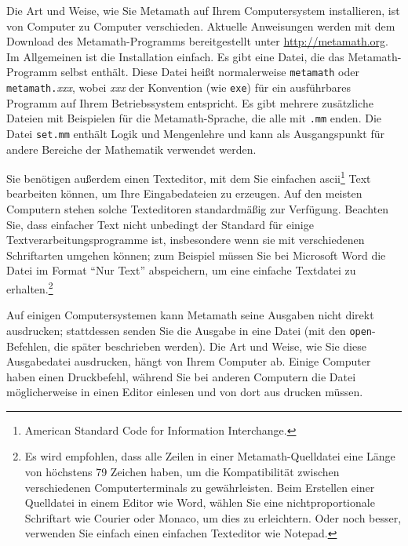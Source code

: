 Die Art und Weise, wie Sie Metamath auf Ihrem Computersystem installieren, ist von Computer zu Computer verschieden.  Aktuelle Anweisungen werden mit dem Download des Metamath-Programms bereitgestellt unter \url{http://metamath.org}.  Im Allgemeinen ist die Installation einfach.
Es gibt eine Datei, die das Metamath-Programm selbst enthält.  
Diese Datei heißt normalerweise \texttt{metamath} oder \texttt{metamath.}{\em xxx}, wobei {\em xxx} der Konvention (wie \texttt{exe}) für ein ausführbares Programm auf Ihrem Betriebssystem entspricht.  Es gibt mehrere zusätzliche Dateien mit Beispielen für die Metamath-Sprache, die alle mit \texttt{.mm} enden.  Die Datei \texttt{set.mm} enthält Logik und Mengenlehre und kann als Ausgangspunkt für andere Bereiche der Mathematik verwendet werden.

Sie benötigen außerdem einen Texteditor, mit dem Sie einfachen {\sc ascii}\footnote{American Standard Code for Information Interchange.} Text bearbeiten können, um Ihre Eingabedateien zu erzeugen.  Auf den meisten Computern stehen solche Texteditoren standardmäßig zur Verfügung.  Beachten Sie, dass einfacher Text nicht unbedingt der Standard für einige Textverarbeitungsprogramme ist, insbesondere wenn sie mit verschiedenen Schriftarten umgehen können; zum Beispiel müssen Sie bei Microsoft Word die Datei im Format "`Nur Text"' abspeichern, um eine einfache Textdatei zu erhalten.\footnote{Es wird empfohlen, dass alle Zeilen in einer Metamath-Quelldatei eine Länge von höchstens 79 Zeichen haben, um die Kompatibilität zwischen verschiedenen Computerterminals zu gewährleisten.  Beim Erstellen einer Quelldatei in einem Editor wie Word, wählen Sie eine nichtproportionale Schriftart wie Courier oder Monaco, um dies zu erleichtern.  Oder noch besser, verwenden Sie einfach einen einfachen Texteditor wie Notepad.}

Auf einigen Computersystemen kann Metamath seine Ausgaben nicht direkt ausdrucken; stattdessen senden Sie die Ausgabe in eine Datei (mit den \texttt{open}-Befehlen, die später beschrieben werden).  Die Art und Weise, wie Sie diese Ausgabedatei ausdrucken, hängt von Ihrem Computer ab. Einige Computer haben einen Druckbefehl, während Sie bei anderen Computern die Datei möglicherweise in einen Editor einlesen und von dort aus drucken müssen.

